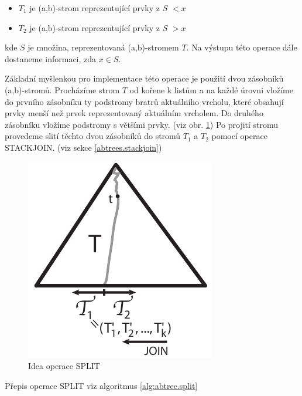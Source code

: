 \begin{itemize}
  \item $T_1$ je (a,b)-strom reprezentující prvky z $S$ $< x$
  \item $T_2$ je (a,b)-strom reprezentující prvky z $S$ $> x$
\end{itemize}

kde $S$ je množina, reprezentovaná (a,b)-stromem $T$.
Na výstupu této operace dále dostaneme informaci, zda $x \in S$.

Základní myšlenkou pro implementace této operace je použití dvou zásobníků
(a,b)-stromů. Procházíme strom $T$ od kořene k listům a na každé úrovni
vložíme do prvního zásobníku ty podstromy bratrů aktuálního vrcholu, které
obsahují prvky menší než prvek reprezentovaný aktuálním vrcholem. Do
druhého zásobníku vložíme podstromy s většími prvky. 
(viz obr. \ref{fig:abtree.split})
Po projití stromu
provedeme slití těchto dvou zásobníků do stromů $T_1$ a $T_2$ pomocí
operace STACKJOIN. (viz sekce \ref{abtrees.stackjoin})

\begin{figure}
\centering\includegraphics{pics/abtree-split}
\caption{Idea operace SPLIT}
\label{fig:abtree.split}
\end{figure}

Přepis operace SPLIT viz algoritmus \ref{alg:abtree.split}


